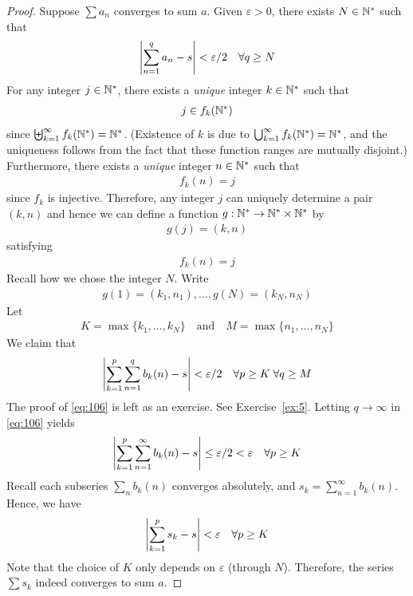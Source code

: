 \documentclass[thmcnt=section, 12pt]{my-elegantbook}
\begin{document}
\begin{proof}
    Suppose $\sum a_n$ converges to sum $a$. Given $\varepsilon > 0$, there exists $N \in \mathbb{N}^\ast$ such that 
    \begin{align}
        \left\lvert \sum_{n=1}^q a_n - s \right\rvert < \varepsilon / 2
        \quad \forall q \geq N
        \label{eq:107}
    \end{align}
    For any integer $j \in \mathbb{N}^\ast$, there exists a \textit{unique} integer $k \in \mathbb{N}^\ast$ such that 
    \begin{align*}
        j \in f_k(\mathbb{N}^\ast)
    \end{align*}
    since $\biguplus_{k=1}^\infty f_k(\mathbb{N}^\ast) = \mathbb{N}^\ast$. (Existence of $k$ is due to $\bigcup_{k=1}^\infty f_k(\mathbb{N}^\ast) = \mathbb{N}^\ast$, and the uniqueness follows from the fact that these function ranges are mutually disjoint.) Furthermore, there exists a \textit{unique} integer $n \in \mathbb{N}^\ast$ such that 
    \begin{align*}
        f_k(n) = j
    \end{align*}
    since $f_k$ is injective. Therefore, any integer $j$ can uniquely determine a pair $(k, n)$ and hence we can define a function $g: \mathbb{N}^\ast \to \mathbb{N}^\ast \times \mathbb{N}^\ast$ by 
    \begin{align*}
        g(j) = (k, n)
    \end{align*}
    satisfying
    \begin{align*}
        f_k(n) = j
    \end{align*}
    Recall how we chose the integer $N$. Write
    \begin{align*}
        g(1) = (k_1, n_1), \ldots, g(N) = (k_N, n_N)
    \end{align*}
    Let 
    \begin{align*}
        K = \max \{ k_1, \ldots, k_N \}
        \quad \text{and} \quad
        M = \max \{ n_1, \ldots, n_N \}
    \end{align*}
    We claim that 
    \begin{align}
        \left\lvert \sum_{k=1}^p \sum_{n=1}^q b_k(n) - s \right\rvert < \varepsilon / 2
        \quad \forall p \geq K \;
        \forall q \geq M
        \label{eq:106}
    \end{align}
    The proof of \eqref{eq:106} is left as an exercise. See Exercise~\ref{ex:5}. Letting $q \to \infty$ in \eqref{eq:106} yields
    \begin{align*}
       \left\lvert \sum_{k=1}^p \sum_{n=1}^\infty b_k(n) - s \right\rvert \leq \varepsilon / 2 < \varepsilon
        \quad \forall p \geq K
    \end{align*}
    Recall each subseries $\sum_n b_k(n)$ converges absolutely, and $s_k = \sum_{n=1}^\infty b_k(n)$. Hence, we have 
    \begin{align*}
       \left\lvert \sum_{k=1}^p s_k - s \right\rvert
       < \varepsilon
        \quad \forall p \geq K
    \end{align*}
    Note that the choice of $K$ only depends on $\varepsilon$ (through $N$). Therefore, the series $\sum s_k$ indeed converges to sum $a$.
\end{proof}
\end{document}
